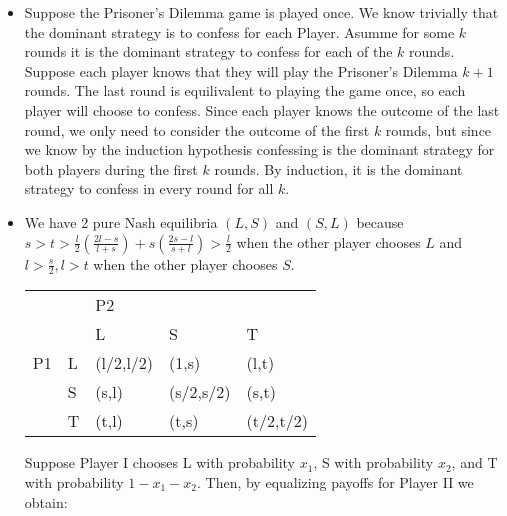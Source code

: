 \documentclass[10pt]{article}[H]
\begin{document}
\begin{itemize}
    \item [\textbf{Exercise 4.4}] Suppose the Prisoner's Dilemma game is played once. We know trivially that the dominant strategy is to confess for each Player. 
    Asumme for some $k$ rounds it is the dominant strategy to confess for each of the $k$ rounds. 
    Suppose each player knows that they will play the Prisoner's Dilemma $k+1$ rounds. 
    The last round is equilivalent to playing the game once, so each player will choose to confess.
    Since each player knows the outcome of the last round, we only need to consider the outcome of the first $k$ rounds, but since we know by the induction hypothesis confessing is the dominant strategy for both players during the first $k$ rounds. 
    By induction, it is the dominant strategy to confess in every round for all $k$. 
    \item [\textbf{Exercise 4.5}] We have 2 pure Nash equilibria $(L,S)$ and $(S,L)$ because $s>t>\frac{l}{2}(\frac{2l-s}{l+s})+s(\frac{2s-l}{s+l})>\frac{l}{2}$ when the other player chooses $L$ and $l>\frac{s}{2},l>t$ when the other player chooses $S$.
    \begin{table}[H]
        \begin{tabular}{lllll}
                                &                        & P2                             &                                &                                \\ \cline{2-5} 
        \multicolumn{1}{l|}{}   & \multicolumn{1}{l|}{}  & \multicolumn{1}{l|}{L}         & \multicolumn{1}{l|}{S}         & \multicolumn{1}{l|}{T}         \\ \cline{2-5} 
        \multicolumn{1}{l|}{P1} & \multicolumn{1}{l|}{L} & \multicolumn{1}{l|}{(l/2,l/2)} & \multicolumn{1}{l|}{(1,s)}     & \multicolumn{1}{l|}{(l,t)}     \\ \cline{2-5} 
        \multicolumn{1}{l|}{}   & \multicolumn{1}{l|}{S} & \multicolumn{1}{l|}{(s,l)}     & \multicolumn{1}{l|}{(s/2,s/2)} & \multicolumn{1}{l|}{(s,t)}     \\ \cline{2-5} 
        \multicolumn{1}{l|}{}   & \multicolumn{1}{l|}{T} & \multicolumn{1}{l|}{(t,l)}     & \multicolumn{1}{l|}{(t,s)}     & \multicolumn{1}{l|}{(t/2,t/2)} \\ \cline{2-5} 
        \end{tabular}
    \end{table}
        Suppose Player I chooses L with probability $x_1$, S with probability $x_2$, and T with probability $1-x_1-x_2$. Then, by equalizing payoffs for Player II we obtain:

\end{itemize}
\end{document}
